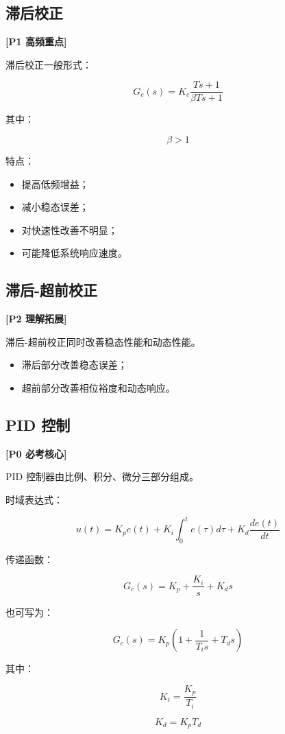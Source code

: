 \documentclass[UTF8,a4paper,12pt]{ctexart}
\newcommand{\Pzero}{\textcolor{p0}{\textbf{[P0 必考核心]}}}
\newcommand{\Pone}{\textcolor{p1}{\textbf{[P1 高频重点]}}}
\newcommand{\Ptwo}{\textcolor{p2}{\textbf{[P2 理解拓展]}}}
\begin{document}
\subsection{滞后校正}

\Pone

滞后校正一般形式：

\[
G_c(s)=K_c\frac{Ts+1}{\beta Ts+1}
\]

其中：

\[
\beta>1
\]

特点：

\begin{itemize}
    \item 提高低频增益；
    \item 减小稳态误差；
    \item 对快速性改善不明显；
    \item 可能降低系统响应速度。
\end{itemize}

\subsection{滞后-超前校正}

\Ptwo

滞后-超前校正同时改善稳态性能和动态性能。

\begin{itemize}
    \item 滞后部分改善稳态误差；
    \item 超前部分改善相位裕度和动态响应。
\end{itemize}

\subsection{PID 控制}

\Pzero

PID 控制器由比例、积分、微分三部分组成。

时域表达式：

\[
u(t)=K_pe(t)+K_i\int_0^t e(\tau)d\tau+K_d\frac{de(t)}{dt}
\]

传递函数：

\[
G_c(s)=K_p+\frac{K_i}{s}+K_ds
\]

也可写为：

\[
G_c(s)=K_p\left(1+\frac{1}{T_is}+T_ds\right)
\]

其中：

\[
K_i=\frac{K_p}{T_i}
\]

\[
K_d=K_pT_d
\]
\end{document}
